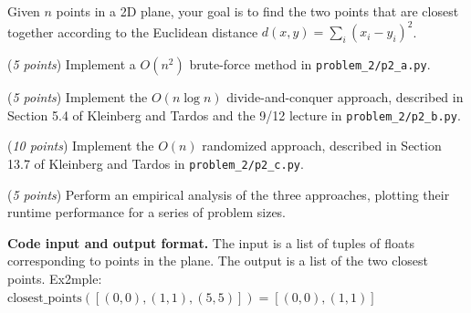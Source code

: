 \documentclass{hw}
\newcommand{\io}{\textbf{Code input and output format.} }
\begin{document}
\begin{problem}
  Given $n$ points in a 2D plane, your goal is to find the two points that are closest together
  according to the Euclidean distance $d(x,y) = \sum_i (x_i - y_i)^2$.

  \begin{subproblem}
    (\textit{5 points}) Implement a $O(n^2)$ brute-force method in \texttt{problem\_2/p2\_a.py}.
  \end{subproblem}

  \begin{subproblem}
    (\textit{5 points}) Implement the $O(n \log n)$ divide-and-conquer approach,
    described in Section 5.4 of Kleinberg and Tardos and the 9/12 lecture in \texttt{problem\_2/p2\_b.py}.
  \end{subproblem}

  \begin{subproblem}
    (\textit{10 points}) Implement the $O(n)$ randomized approach,
    described in Section 13.7 of Kleinberg and Tardos in \texttt{problem\_2/p2\_c.py}.
  \end{subproblem}

  \begin{subproblem}
      (\textit{5 points})
      Perform an empirical analysis of the three approaches,
      plotting their runtime performance for a series of problem sizes.
  \end{subproblem}

  \io The input is a list of tuples of floats corresponding to points in the plane.
  The output is a list of the two closest points.
  Ex2mple: $\text{closest\_points}([(0,0), (1,1), (5,5)]) = [(0,0), (1,1)]$
\end{problem}
\end{document}
